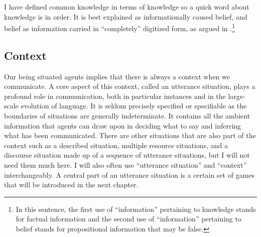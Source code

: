 

I have defined common knowledge in terms of knowledge so a quick word about knowledge is in order. It is best explained as informationally caused belief, and belief as information carried in ``completely'' digitized form, as argued in \citet[86, Chapters~7 and 8]{dretske:kfi}.\footnote{In this sentence, the first use of ``information'' pertaining to knowledge stands for factual information and the second use of ``information'' pertaining to belief stands for propositional information that may be false.}


\subsection{Context}

Our being situated agents implies that there is always a context when we communicate. A core aspect of this context, called an utterance situation, plays a profound role in communication, both in particular instances and in the large-scale evolution of language. It is seldom precisely specified or specifiable as the boundaries of situations are generally indeterminate. It contains all the ambient information that agents can draw upon in deciding what to say and inferring what has been communicated. There are other situations that are also part of the context such as a described situation, multiple resource situations, and a discourse situation made up of a sequence of utterance situations, but I will not need them much here. I will also often use ``utterance situation'' and ``context'' interchangeably. A central part of an utterance situation is a certain set of games that will be introduced in the next chapter.

